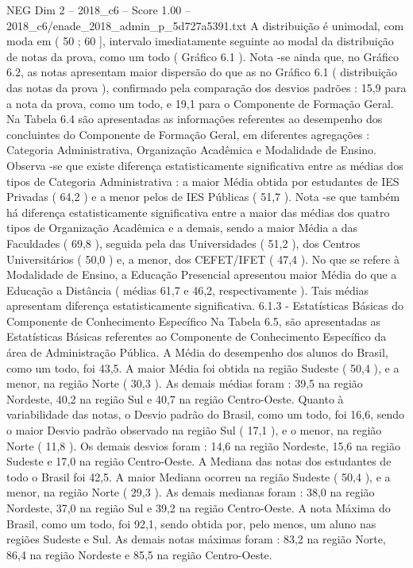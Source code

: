 \begin{textsample}{NEG Dim 2 – 2018\_c6 – Score 1.00 – 2018\_c6/enade\_2018\_admin\_p\_5d727a5391.txt}
A distribuição é unimodal, com moda em ( 50 ; 60 ], intervalo imediatamente seguinte ao modal da distribuição de notas da prova, como um todo ( Gráfico 6.1 ).
Nota -se ainda que, no Gráfico 6.2, as notas apresentam maior dispersão do que as no Gráfico 6.1 ( distribuição das notas da prova ), confirmado pela comparação dos desvios padrões : 15,9 para a nota da prova, como um todo, e 19,1 para o Componente de Formação Geral.
Na Tabela 6.4 são apresentadas as informações referentes ao desempenho dos concluintes do Componente de Formação Geral, em diferentes agregações : Categoria Administrativa, Organização Acadêmica e Modalidade de Ensino.
Observa -se que existe diferença estatisticamente significativa entre as médias dos tipos de Categoria Administrativa : a maior Média obtida por estudantes de IES Privadas ( 64,2 ) e a menor pelos de IES Públicas ( 51,7 ).
Nota -se que também há diferença estatisticamente significativa entre a maior das médias dos quatro tipos de Organização Acadêmica e a demais, sendo a maior Média a das Faculdades ( 69,8 ), seguida pela das Universidades ( 51,2 ), dos Centros Universitários ( 50,0 ) e, a menor, dos CEFET/IFET ( 47,4 ).
No que se refere à Modalidade de Ensino, a Educação Presencial apresentou maior Média do que a Educação a Distância ( médias 61,7 e 46,2, respectivamente ).
Tais médias apresentam diferença estatisticamente significativa. 6.1.3 - Estatísticas Básicas do Componente de Conhecimento Específico Na Tabela 6.5, são apresentadas as Estatísticas Básicas referentes ao Componente de Conhecimento Específico da área de Administração Pública.
A Média do desempenho dos alunos do Brasil, como um todo, foi 43,5.
A maior Média foi obtida na região Sudeste ( 50,4 ), e a menor, na região Norte ( 30,3 ).
As demais médias foram : 39,5 na região Nordeste, 40,2 na região Sul e 40,7 na região Centro-Oeste.
Quanto à variabilidade das notas, o Desvio padrão do Brasil, como um todo, foi 16,6, sendo o maior Desvio padrão observado na região Sul ( 17,1 ), e o menor, na região Norte ( 11,8 ).
Os demais desvios foram : 14,6 na região Nordeste, 15,6 na região Sudeste e 17,0 na região Centro-Oeste.
A Mediana das notas dos estudantes de todo o Brasil foi 42,5.
A maior Mediana ocorreu na região Sudeste ( 50,4 ), e a menor, na região Norte ( 29,3 ).
As demais medianas foram : 38,0 na região Nordeste, 37,0 na região Sul e 39,2 na região Centro-Oeste.
A nota Máxima do Brasil, como um todo, foi 92,1, sendo obtida por, pelo menos, um aluno nas regiões Sudeste e Sul.
As demais notas máximas foram : 83,2 na região Norte, 86,4 na região Nordeste e 85,5 na região Centro-Oeste.

\end{textsample}
